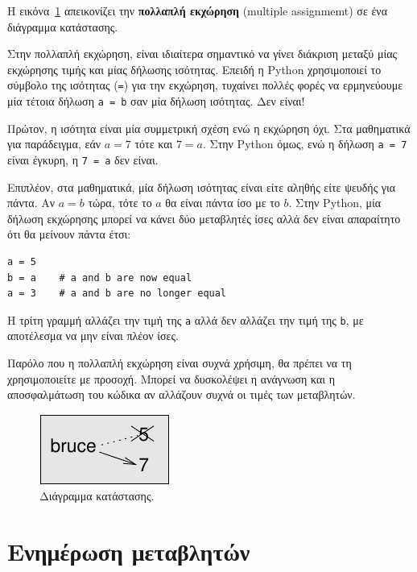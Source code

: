 \documentclass[10pt]{book}
\begin{document}
Η εικόνα~\ref{fig.assign2} απεικονίζει την {\bf πολλαπλή
εκχώρηση} (multiple assignmemt) σε ένα διάγραμμα κατάστασης.
 

Στην πολλαπλή εκχώρηση, είναι ιδιαίτερα σημαντικό να γίνει διάκριση
μεταξύ μίας εκχώρησης τιμής και μίας δήλωσης ισότητας. Επειδή η
Python χρησιμοποιεί το σύμβολο της ισότητας ({\tt =}) για την
εκχώρηση, τυχαίνει πολλές φορές να ερμηνεύουμε μία τέτοια δήλωση {\tt a = b}
σαν μία δήλωση ισότητας. Δεν είναι!

Πρώτον, η ισότητα είναι μία συμμετρική σχέση ενώ η εκχώρηση όχι. Στα
μαθηματικά για παράδειγμα, εάν $a=7$ τότε και $7=a$. 
Στην Python όμως, ενώ η δήλωση {\tt a = 7} είναι έγκυρη,
η {\tt 7 = a} δεν είναι.

Επιπλέον, στα μαθηματικά, μία δήλωση ισότητας είναι είτε αληθής είτε
ψευδής για πάντα. Αν $a=b$ τώρα, τότε το $a$ θα είναι
πάντα ίσο με το $b$. Στην Python, μία δήλωση εκχώρησης
μπορεί να κάνει δύο μεταβλητές ίσες αλλά δεν είναι απαραίτητο 
ότι θα μείνουν πάντα έτσι:

\begin{verbatim}
a = 5
b = a    # a and b are now equal
a = 3    # a and b are no longer equal
\end{verbatim}
%

Η τρίτη γραμμή αλλάζει την τιμή της {\tt a} αλλά δεν αλλάζει
την τιμή της {\tt b}, με αποτέλεσμα να μην είναι πλέον ίσες.

Παρόλο που η πολλαπλή εκχώρηση είναι συχνά χρήσιμη, θα πρέπει να τη
χρησιμοποιείτε με προσοχή. Μπορεί να δυσκολέψει η ανάγνωση και η αποσφαλμάτωση του κώδικα αν αλλάζουν συχνά οι τιμές των μεταβλητών.

\begin{figure}
\centerline
{\includegraphics[scale=0.8]{figs/assign2.pdf}}
\caption{Διάγραμμα κατάστασης.}
\label{fig.assign2}
\end{figure}


\section{Ενημέρωση μεταβλητών}
\label{update}

\end{document}
